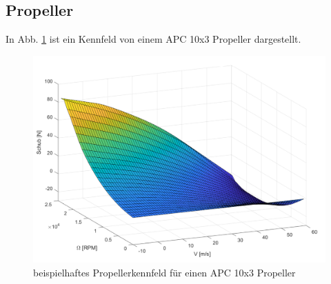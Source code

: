 \begin{appendix}
\section{Propeller}
\label{sec:propellerkennfeld}
In Abb. \ref{abb:propellerkennfeld} ist ein Kennfeld von einem APC 10x3 Propeller dargestellt. 
\begin{figure}[H]
\centering
	\includegraphics[scale=0.7]{Diagramme/Propellerkennfeld.pdf}
	\caption{beispielhaftes Propellerkennfeld für einen APC 10x3 Propeller}
	\label{abb:propellerkennfeld}
\end{figure}


\end{appendix}
